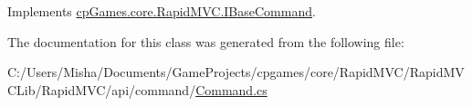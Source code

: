 Implements \mbox{\hyperlink{interfacecp_games_1_1core_1_1_rapid_m_v_c_1_1_i_base_command_aaf935c8b144d93bffac5b2e4fbe9881b}{cp\+Games.\+core.\+Rapid\+M\+V\+C.\+I\+Base\+Command}}.



The documentation for this class was generated from the following file\+:\begin{DoxyCompactItemize}
\item 
C\+:/\+Users/\+Misha/\+Documents/\+Game\+Projects/cpgames/core/\+Rapid\+M\+V\+C/\+Rapid\+M\+V\+C\+Lib/\+Rapid\+M\+V\+C/api/command/\mbox{\hyperlink{_command_8cs}{Command.\+cs}}\end{DoxyCompactItemize}
